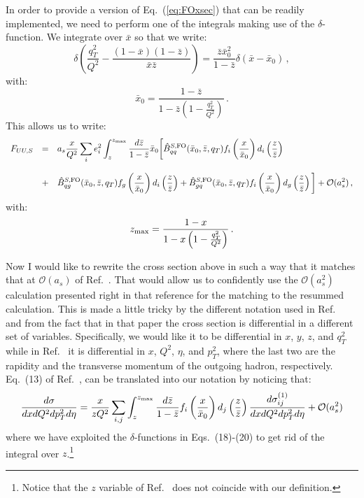 \documentclass[10pt,a4paper]{article}
\begin{document}
In order to provide a version of Eq.~(\ref{eq:FOxsec}) that can be
readily implemented, we need to perform one of the integrals making
use of the $\delta$-function. We integrate over $\bar{x}$ so that we
write:
\begin{equation}
\delta\left(\frac{q_T^2}{Q^2}-\frac{(1-\bar{x})(1-\bar{z})}{\bar{x}\bar{z}}\right)
= \frac{\bar{z}\bar{x}_0^2}{1-\bar{z}}\delta(\bar{x} - \bar{x}_0)\,,
\end{equation}
with:
\begin{equation}\label{eq:x0bar}
  \bar{x}_0 = \frac{1-\bar{z}}{1-\bar{z}\left(1-\frac{q_T^2}{Q^2}\right)}\,.
\end{equation}
This allows us to write:
\begin{equation}\label{eq:FOxsecFin}
\begin{array}{rcl}
  F_{UU,S}&=&\displaystyle 
  a_s\frac{x }{Q^2}\sum_{i}e_i^2\int_z^{z_{\rm max}} \frac{d\bar{z}}{1-\bar{z}}\bar{x}_0\bigg[\hat{B}_{qq}^{S,
    \rm FO}(\bar{x}_0,\bar{z},q_T)f_i\left(\frac{x}{\bar{x}_0}\right)
              d_i\left(\frac{z}{\bar{z}}\right)\\
\\
&+&\displaystyle \hat{B}_{qg}^{S,
    \rm FO}(\bar{x}_0,\bar{z},q_T)f_g\left(\frac{x}{\bar{x}_0}\right)
              d_i\left(\frac{z}{\bar{z}}\right)+ \hat{B}_{gq}^{S,
    \rm FO}(\bar{x}_0,\bar{z},q_T)f_i\left(\frac{x}{\bar{x}_0}\right)
              d_g\left(\frac{z}{\bar{z}}\right)\bigg]
+\mathcal{O}(a_s^2)\,,
\end{array}
\end{equation}
with:
\begin{equation}
z_{\rm max} = \frac{1-x}{1-x\left(1-\frac{q_T^2}{Q^2}\right)}\,.
\end{equation}

Now I would like to rewrite the cross section above in such a way that
it matches that at $\mathcal{O}(a_s)$ of
Ref.~\cite{Daleo:2004pn}. That would allow us to confidently use the
$\mathcal{O}(a_s^2)$ calculation presented right in that reference for
the matching to the resummed calculation. This is made a little tricky
by the different notation used in Ref.~\cite{Daleo:2004pn} and from
the fact that in that paper the cross section is differential in a
different set of variables. Specifically, we would like it to be
differential in $x$, $y$, $z$, and $q_T^2$ while in
Ref.~\cite{Daleo:2004pn} it is differential in $x$, $Q^2$, $\eta$, and
$p_T^2$, where the last two are the rapidity and the transverse
momentum of the outgoing hadron, respectively. Eq.~(13) of
Ref.~\cite{Daleo:2004pn}, can be translated into our notation by
noticing that:
\begin{equation}\label{eq:Daleoetal}
\frac{d\sigma}{dxdQ^2d p_T^2 d\eta} = \frac{x}{z Q^2}\sum_{i,j}\int_z^{z_{\rm
    max}} \frac{d\bar{z}}{1-\bar{z}} f_i\left(\frac{x}{\bar{x}_0}\right)d_j\left(\frac{z}{\bar{z}}\right) \frac{d\sigma_{ij}^{(1)}}{dxdQ^2d p_T^2 d\eta}+\mathcal{O}(a_s^2)
\end{equation}
where we have exploited the $\delta$-functions in Eqs.~(18)-(20) to
get rid of the integral over $z$.\footnote{Notice that the $z$
  variable of Ref.~\cite{Daleo:2004pn} does not coincide with our
  definition.}
\end{document}
